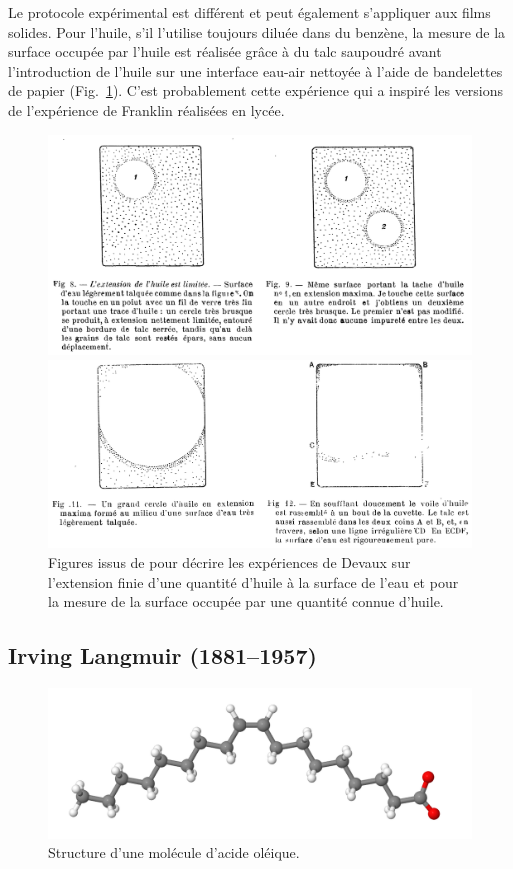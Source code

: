 \documentclass[12pt,a4paper]{article}
\begin{document}
Le protocole expérimental est différent \cite{Marcelin1914, Devaux1931} et peut également s'appliquer aux films solides.
Pour l'huile, s'il l'utilise toujours diluée dans du benzène, la mesure de la surface occupée par l'huile est réalisée grâce à du talc saupoudré avant l'introduction de l'huile sur une interface eau-air nettoyée à l'aide de bandelettes de papier (Fig.~\ref{fig:devaux1931}).
C'est probablement cette expérience qui a inspiré les versions de l'expérience de Franklin réalisées en lycée.
\begin{figure}
\center
\includegraphics[scale=0.5]{devaux1931a.png}

\includegraphics[scale=0.5]{devaux1931b.png}

\caption{Figures issus de \cite{Devaux1931} pour décrire les expériences de Devaux sur l'extension finie d'une quantité d'huile à la surface de l'eau et pour la mesure de la surface occupée par une quantité connue d'huile.}
\label{fig:devaux1931}
\end{figure}

\subsection{Irving Langmuir (1881--1957)}

\begin{figure}
\center
\includegraphics[scale=0.4]{acide_oleique.png}
\caption{Structure d'une molécule d'acide oléique.}
\label{fig:acide_oleique}
\end{figure}
\end{document}
